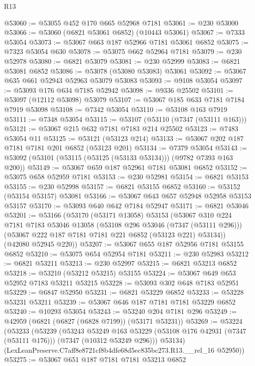 \begin{lexlean}{R13}
\begin{coremodule}
@53060 := @53055 @452 @170 @665 @52968 @7181
@53061 := @230 @53000
@53066 := @53060 (@6821 @53061 @6852) (@10443 @53061)
@53067 := @7333 @53054
@53073 := @53067 @663 @187 @52966 @7181 @53061 @6852
@53075 := @7323 @53054 @630
@53078 := @53075 @662 @52964 @7181
@53079 := @230 @52978
@53080 := @6821 @53079
@53081 := @230 @52999
@53083 := @6821 @53081 @6852
@53086 := @53078 (@53080 @53083) @53061
@53092 := @53067 @635 @661 @52943 @52963 @53079 @53083
@53093 := @9108 @53054
@53097 := @53093 @176 @634 @7185 @52942
@53098 := @9336 @25502
@53101 := @53097 (@12112 @53098) @53079
@53107 := @53067 @185 @633 @7181 @7184 @7919 @53098
@53108 := @7342 @53054
@53110 := @53108 @163 @7919
@53111 := @7348 @53054
@53115 := @53107 (@53110 (@7347 (@53111 @163)))
@53121 := @53067 @215 @632 @7181 @7183 @214 @25502
@53123 := @7483 @53054 @11
@53125 := @53121 (@53123 @214)
@53133 := @53067 @202 @187 @7181 @7181 @201 @6852 (@53123 @201)
@53134 := @7379 @53054
@53143 := @53092 (@53101 (@53115 (@53125 (@53133 @53134))) (@9782 @7393 @163 @200))
@53149 := @53067 @659 @187 @52961 @7181 @53081 @6852
@53152 := @53075 @658 @52959 @7181
@53153 := @230 @52981
@53154 := @6821 @53153
@53155 := @230 @52998
@53157 := @6821 @53155 @6852
@53160 := @53152 (@53154 @53157) @53081
@53166 := @53067 @643 @657 @52948 @52958 @53153 @53157
@53170 := @53093 @640 @642 @7184 @52947
@53171 := @6821 @53046
@53201 := @53166
    (@53170
      (@53171 @13058)
      @53153
      (@53067
        @310
        @224
        @7181
        @7183
        @53046
        @13058
        (@53108 @296 @53046 (@7347 (@53111 @296)))
        (@53067 @222 @187 @7181 @7181 @221 @6852 (@53123 @221) @53134))
      (@42080 @52945 @220))
@53207 := @53067 @655 @187 @52956 @7181 @53155 @6852
@53210 := @53075 @654 @52954 @7181
@53211 := @230 @52983
@53212 := @6821 @53211
@53213 := @230 @52997
@53215 := @6821 @53213 @6852
@53218 := @53210 (@53212 @53215) @53155
@53224 := @53067 @649 @653 @52952 @7183 @53211 @53215
@53228 := @53093 @302 @648 @7183 @52951
@53229 := @6847 @52950
@53231 := @6821 @53229 @6852
@53233 := @53228 @53231 @53211
@53239 := @53067 @646 @187 @7181 @7181 @53229 @6852
@53240 := @10293 @53054
@53243 := @53240 @204 @7181 @296
@53249 := @42959 (@6821 (@6827 (@6828 @7199)) (@53171 @53231))
@53269 := @53224
    (@53233
      (@53239
        (@53243
          @53249
          @163
          @53229
          (@53108 @176 @42931 (@7347 (@53111 @176)))
          (@7347 (@10312 @53249 @296)))
        @53134)
      (LexLeanPreserve.C7aff8e8721cf8b4dfe68d5ec835bc273.R13.__rel_16 @52950))
@53275 := @53067 @651 @187 @7181 @7181 @53213 @6852

\end{coremodule}
\end{lexlean}
